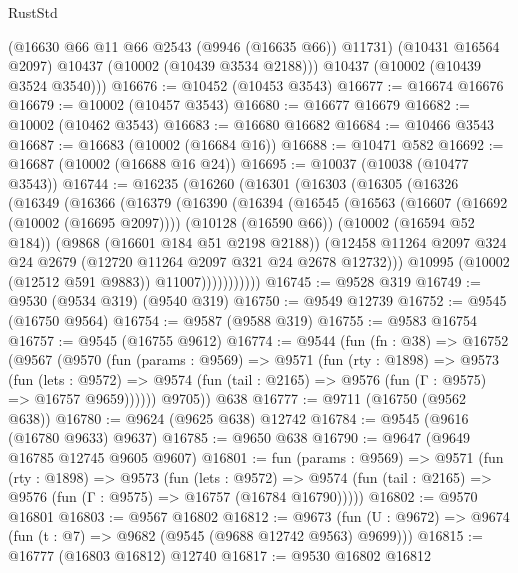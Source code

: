 \begin{lexlean}{RustStd}
\begin{coremodule}
        (@16630 @66 @11 @66 @2543 (@9946 (@16635 @66)) @11731)
        (@10431 @16564 @2097)
        @10437
        (@10002 (@10439 @3534 @2188)))
      @10437
      (@10002 (@10439 @3524 @3540)))
@16676 := @10452 (@10453 @3543)
@16677 := @16674 @16676
@16679 := @10002 (@10457 @3543)
@16680 := @16677 @16679
@16682 := @10002 (@10462 @3543)
@16683 := @16680 @16682
@16684 := @10466 @3543
@16687 := @16683 (@10002 (@16684 @16))
@16688 := @10471 @582
@16692 := @16687 (@10002 (@16688 @16 @24))
@16695 := @10037 (@10038 (@10477 @3543))
@16744 := @16235
    (@16260
      (@16301
        (@16303
          (@16305
            (@16326
              (@16349
                (@16366
                  (@16379
                    (@16390
                      (@16394
                        (@16545
                          (@16563
                            (@16607 (@16692 (@10002 (@16695 @2097))))
                            (@10128 (@16590 @66))
                            (@10002 (@16594 @52 @184))
                            (@9868 (@16601 @184 @51 @2198 @2188))
                            (@12458
                              @11264
                              @2097
                              @324
                              @24
                              @2679
                              (@12720 @11264 @2097 @321 @24 @2678 @12732)))
                          @10995
                          (@10002 (@12512 @591 @9883))
                          @11007)))))))))))
@16745 := @9528 @319
@16749 := @9530 (@9534 @319) (@9540 @319)
@16750 := @9549 @12739
@16752 := @9545 (@16750 @9564)
@16754 := @9587 (@9588 @319)
@16755 := @9583 @16754
@16757 := @9545 (@16755 @9612)
@16774 := @9544
    (fun (fn : @38) =>
    @16752
      (@9567
        (@9570
          (fun (params : @9569) =>
          @9571
            (fun (rty : @1898) =>
            @9573
              (fun (lets : @9572) =>
              @9574 (fun (tail : @2165) => @9576 (fun (Γ : @9575) => @16757 @9659))))))
        @9705))
    @638
@16777 := @9711 (@16750 (@9562 @638))
@16780 := @9624 (@9625 @638) @12742
@16784 := @9545 (@9616 (@16780 @9633) @9637)
@16785 := @9650 @638
@16790 := @9647 (@9649 @16785 @12745 @9605 @9607)
@16801 := fun (params : @9569) =>
  @9571
    (fun (rty : @1898) =>
    @9573
      (fun (lets : @9572) =>
      @9574 (fun (tail : @2165) => @9576 (fun (Γ : @9575) => @16757 (@16784 @16790)))))
@16802 := @9570 @16801
@16803 := @9567 @16802
@16812 := @9673
    (fun (U : @9672) => @9674 (fun (t : @7) => @9682 (@9545 (@9688 @12742 @9563) @9699)))
@16815 := @16777 (@16803 @16812) @12740
@16817 := @9530 @16802 @16812

\end{coremodule}
\end{lexlean}
